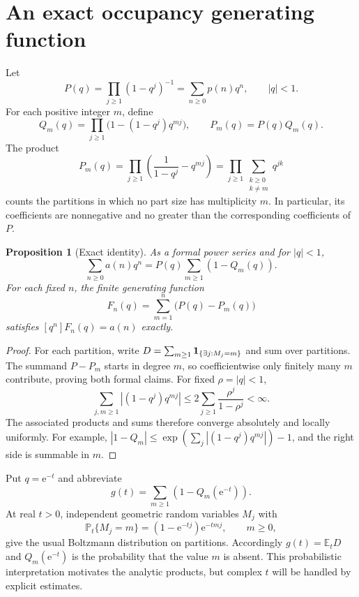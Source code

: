 \documentclass[11pt,letterpaper]{article}
\numberwithin{equation}{section}
\newtheorem{proposition}[theorem]{Proposition}
\theoremstyle{definition}\newtheorem{definition}[theorem]{Definition}
\theoremstyle{remark}\newtheorem{remark}[theorem]{Remark}
\newcommand{\E}{\mathbb E}
\newcommand{\Prob}{\mathbb P}
\newcommand{\ee}{\mathrm e}
\begin{document}
\section{An exact occupancy generating function}\label{dmv:cnt:sec:exact}
Let
\begin{equation}\label{dmv:cnt:eq:P}
P(q)=\prod_{j\ge1}(1-q^j)^{-1}=\sum_{n\ge0}p(n)q^n,\qquad |q|<1.
\end{equation}
For each positive integer $m$, define
\begin{equation}\label{dmv:cnt:eq:Q}
Q_m(q)=\prod_{j\ge1}\bigl(1-(1-q^j)q^{mj}\bigr),\qquad
P_m(q)=P(q)Q_m(q).
\end{equation}
The product
\begin{equation}\label{dmv:cnt:eq:forbidden}
P_m(q)=\prod_{j\ge1}\left(\frac1{1-q^j}-q^{mj}\right)
      =\prod_{j\ge1}\sum_{\substack{k\ge0\\k\ne m}}q^{jk}
\end{equation}
counts the partitions in which no part size has multiplicity $m$. In particular, its coefficients are nonnegative and no greater than the corresponding coefficients of $P$.

\begin{proposition}[Exact identity]\label{dmv:cnt:prop:gf}
As a formal power series and for $|q|<1$,
\begin{equation}\label{dmv:cnt:eq:gf}
\sum_{n\ge0}a(n)q^n=P(q)\sum_{m\ge1}(1-Q_m(q)).
\end{equation}
For each fixed $n$, the finite generating function
\begin{equation}\label{dmv:cnt:eq:Fn}
F_n(q)=\sum_{m=1}^n\bigl(P(q)-P_m(q)\bigr)
\end{equation}
satisfies $[q^n]F_n(q)=a(n)$ exactly.
\end{proposition}
\begin{proof}
For each partition, write $D=\sum_{m\ge1}{\bf1}_{\{\exists j:M_j=m\}}$ and sum over partitions. The summand $P-P_m$ starts in degree $m$, so coefficientwise only finitely many $m$ contribute, proving both formal claims. For fixed $\rho=|q|<1$,
\[
\sum_{j,m\ge1}|(1-q^j)q^{mj}|
\le2\sum_{j\ge1}\frac{\rho^j}{1-\rho^j}<\infty.
\]
The associated products and sums therefore converge absolutely and locally uniformly. For example, $|1-Q_m|\le\exp(\sum_j|(1-q^j)q^{mj}|)-1$, and the right side is summable in $m$.
\end{proof}

Put $q=\ee^{-t}$ and abbreviate
\begin{equation}\label{dmv:cnt:eq:g}
g(t)=\sum_{m\ge1}\left(1-Q_m(\ee^{-t})\right).
\end{equation}
At real $t>0$, independent geometric random variables $M_j$ with
\begin{equation}\label{dmv:cnt:eq:boltzmann}
\Prob_t\{M_j=m\}=(1-\ee^{-tj})\ee^{-tmj},\qquad m\ge0,
\end{equation}
give the usual Boltzmann distribution on partitions. Accordingly $g(t)=\E_tD$ and $Q_m(\ee^{-t})$ is the probability that the value $m$ is absent. This probabilistic interpretation motivates the analytic products, but complex $t$ will be handled by explicit estimates.
\end{document}
